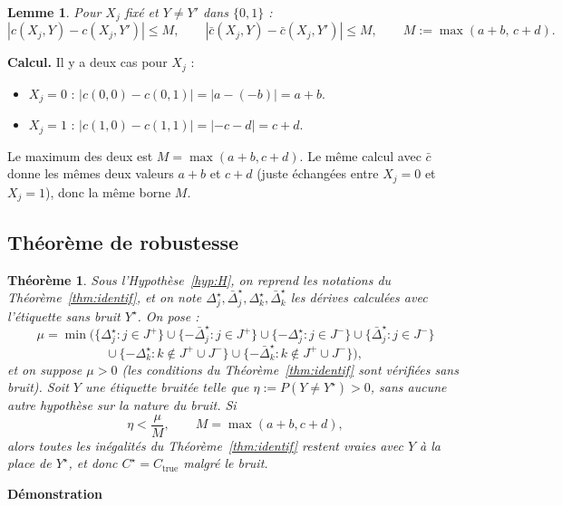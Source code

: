 \documentclass[11pt]{article}
\newtheorem{theorem}{Théorème}
\newtheorem{lemma}{Lemme}
\begin{document}
\begin{lemma}\label{lem:jump}
Pour $X_j$ fixé et $Y \ne Y'$ dans $\{0,1\}$ :
$$|c(X_j,Y)-c(X_j,Y')| \le M, \qquad |\bar c(X_j,Y)-\bar c(X_j,Y')|\le M, \qquad M := \max(a+b,\,c+d).$$
\end{lemma}

\textbf{Calcul.} Il y a deux cas pour $X_j$ :
\begin{itemize}
\item $X_j=0$ : $|c(0,0)-c(0,1)| = |a-(-b)| = a+b$.
\item $X_j=1$ : $|c(1,0)-c(1,1)| = |-c-d| = c+d$.
\end{itemize}
Le maximum des deux est $M = \max(a+b,c+d)$. Le même calcul avec $\bar c$ donne les mêmes deux valeurs $a+b$ et $c+d$ (juste échangées entre $X_j=0$ et $X_j=1$), donc la même borne $M$.

\subsection{Théorème de robustesse}

\begin{theorem}\label{thm:bruit}
Sous l'Hypothèse~\ref{hyp:H}, on reprend les notations du Théorème~\ref{thm:identif}, et on note $\Delta_j^\star, \bar\Delta_j^\star, \Delta_k^\star, \bar\Delta_k^\star$ les dérives calculées avec l'étiquette sans bruit $Y^\star$. On pose :
$$\mu = \min\Big(\{\Delta_j^\star : j\in J^+\} \cup \{-\bar\Delta_j^\star:j\in J^+\} \cup \{-\Delta_j^\star:j\in J^-\} \cup \{\bar\Delta_j^\star:j\in J^-\}$$
$$\cup\ \{-\Delta_k^\star : k\notin J^+\cup J^-\} \cup \{-\bar\Delta_k^\star:k\notin J^+\cup J^-\}\Big),$$
et on suppose $\mu>0$ (les conditions du Théorème~\ref{thm:identif} sont vérifiées sans bruit). Soit $Y$ une étiquette bruitée telle que $\eta := P(Y\ne Y^\star)>0$, sans aucune autre hypothèse sur la nature du bruit. Si
$$\eta < \frac{\mu}{M}, \qquad M=\max(a+b,c+d),$$
alors toutes les inégalités du Théorème~\ref{thm:identif} restent vraies avec $Y$ à la place de $Y^\star$, et donc $C^\star = C_{\text{true}}$ malgré le bruit.
\end{theorem}

\textbf{Démonstration}
\end{document}
